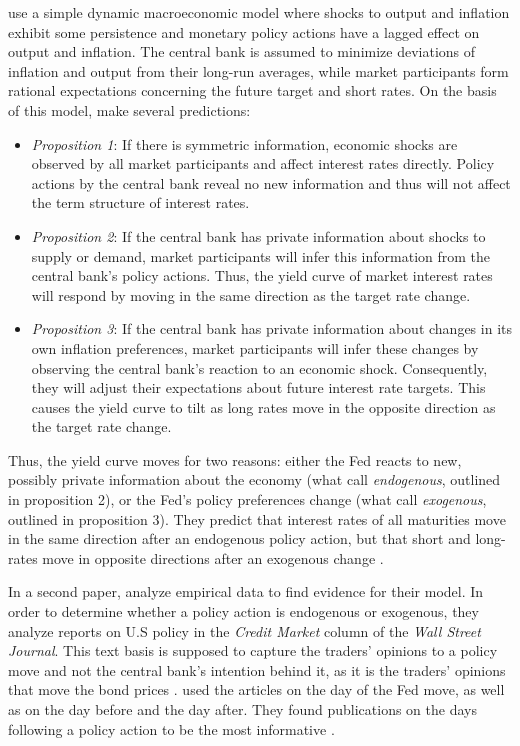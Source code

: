 \documentclass[11pt,a4paper,english,oneside]{book}
\numberwithin{equation}{chapter}
\begin{document}
\citet{Ellingsen.2001} use a simple dynamic macroeconomic model where shocks to output and inflation exhibit some persistence and monetary policy actions have a lagged effect on output and inflation. The central bank is assumed to minimize deviations of inflation and output from their long-run averages, while market participants form rational expectations concerning the future target and short rates. On the basis of this model, \citet[~p. 1599--1602]{Ellingsen.2001} make several predictions:
\begin{itemize}
	\item \textit{Proposition 1}: If there is symmetric information, economic shocks are observed by all market participants and affect  interest rates directly. Policy actions by the central bank reveal no new information and thus will not affect the term structure of interest rates.
	\item \textit{Proposition 2}: If the central bank has private information about shocks to supply or demand, market participants will infer this information from the central bank's policy actions. Thus, the yield curve of market interest rates will respond by moving in the same direction as the target rate change. 
	\item \textit{Proposition 3}: If the central bank has private information about changes in its own inflation preferences, market participants will infer these changes by observing the central bank's reaction to an economic shock. Consequently, they will adjust their expectations about future interest rate targets. This causes the yield curve to tilt as long rates move in the opposite direction as the target rate change. 
\end{itemize}

Thus, the yield curve moves for two reasons: either the Fed reacts to new, possibly private information about the economy (what \citeauthor{Ellingsen.2001} call \textit{endogenous}, outlined in proposition 2), or the Fed's policy preferences change (what \citeauthor{Ellingsen.2001} call \textit{exogenous}, outlined in proposition 3). They predict that interest rates of all maturities move in the same direction after an endogenous policy action, but that short and long-rates move in opposite directions after an exogenous change \citeyearpar[~p. 1594--1595]{Ellingsen.2001}. %

In a second paper, \cite{Ellingsen.2003} analyze empirical data to find evidence for their model. In order to determine whether a policy action is endogenous or exogenous, they analyze reports on U.S policy in the \textit{Credit Market} column of the \textit{Wall Street Journal}. This text basis is supposed to capture the traders' opinions to a policy move and not the central bank's intention behind it, as it is the traders' opinions that move the bond prices \cite[~p. 2]{Ellingsen.2003}. \citeauthor{Ellingsen.2003} used the articles on the day of the Fed move, as well as on the day before and the day after. They found publications on the days following a policy action to be the most informative \citeyearpar[~p. 8]{Ellingsen.2003}.
\end{document}

